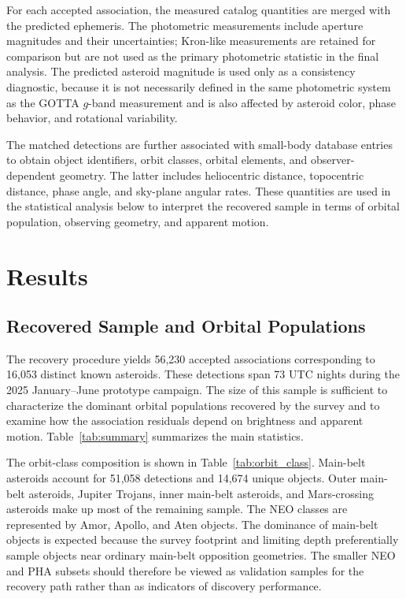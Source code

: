\documentclass[referee]{raa}
\begin{document}
For each accepted association, the measured catalog quantities are merged with the predicted ephemeris. The photometric measurements include aperture magnitudes and their uncertainties; Kron-like measurements are retained for comparison but are not used as the primary photometric statistic in the final analysis. The predicted asteroid magnitude is used only as a consistency diagnostic, because it is not necessarily defined in the same photometric system as the GOTTA $g$-band measurement and is also affected by asteroid color, phase behavior, and rotational variability.

The matched detections are further associated with small-body database entries to obtain object identifiers, orbit classes, orbital elements, and observer-dependent geometry. The latter includes heliocentric distance, topocentric distance, phase angle, and sky-plane angular rates. These quantities are used in the statistical analysis below to interpret the recovered sample in terms of orbital population, observing geometry, and apparent motion.

\section{Results}
\label{sec:results}

\subsection{Recovered Sample and Orbital Populations}

The recovery procedure yields 56,230 accepted associations corresponding to 16,053 distinct known asteroids. These detections span 73 UTC nights during the 2025 January--June prototype campaign. The size of this sample is sufficient to characterize the dominant orbital populations recovered by the survey and to examine how the association residuals depend on brightness and apparent motion. Table~\ref{tab:summary} summarizes the main statistics.



The orbit-class composition is shown in Table~\ref{tab:orbit_class}. Main-belt asteroids account for 51,058 detections and 14,674 unique objects. Outer main-belt asteroids, Jupiter Trojans, inner main-belt asteroids, and Mars-crossing asteroids make up most of the remaining sample. The NEO classes are represented by Amor, Apollo, and Aten objects. The dominance of main-belt objects is expected because the survey footprint and limiting depth preferentially sample objects near ordinary main-belt opposition geometries. The smaller NEO and PHA subsets should therefore be viewed as validation samples for the recovery path rather than as indicators of discovery performance.
\end{document}
